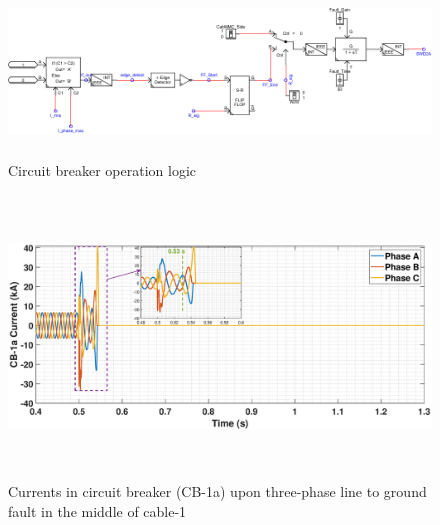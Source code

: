 \begin{figure}[H]
\centering
    \includegraphics[height = 4.5cm,width = \textwidth]{Diagrams/Chapter_5/Fault_logic_New.pdf}
    \caption{Circuit breaker operation logic}
    \label{fig:Fault_logic}
\end{figure}

\begin{figure}[H]
    \includegraphics[height = 7.5cm,width = \textwidth]{Diagrams/Chapter_5/IABC_CB_3phaseSC_new_4.eps}
    \caption{Currents in circuit breaker (CB-1a) upon three-phase line to ground fault in the middle of cable-1}
    \label{Circuit_breaker_3phasefault}
\end{figure}


